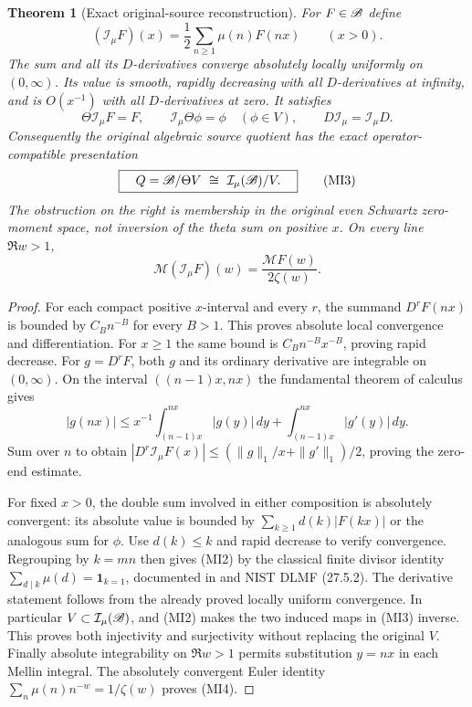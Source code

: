 \documentclass[11pt]{article}
\newtheorem{theorem}{Theorem}[section]
\begin{document}
\begin{theorem}[Exact original-source reconstruction]
For $F\in\mathscr B$ define
\[
 (\mathcal I_\mu F)(x)=\frac12\sum_{n\geq1}\mu(n)F(nx)
       \qquad(x>0).\tag{MI1}
\]
The sum and all its $D$-derivatives converge absolutely locally
uniformly on $(0,\infty)$. Its value is smooth, rapidly decreasing
with all $D$-derivatives at infinity, and is $O(x^{-1})$ with all
$D$-derivatives at zero. It satisfies
\[
 \Theta\mathcal I_\mu F=F,\qquad
 \mathcal I_\mu\Theta\phi=\phi\quad(\phi\in V),\qquad
 D\mathcal I_\mu=\mathcal I_\mu D.
 \tag{MI2}
\]
Consequently the original algebraic source quotient has the exact
operator-compatible presentation
\[
 \boxed{\quad Q=\mathscr B/\Theta V\ \cong\ \mathcal I_\mu(\mathscr B)/V.\quad}
 \tag{MI3}
\]
The obstruction on the right is membership in the original even
Schwartz zero-moment space, not inversion of the theta sum on positive
$x$. On every line $\Re w>1$,
\[
 \mathcal M(\mathcal I_\mu F)(w)
       =\frac{\mathcal MF(w)}{2\zeta(w)}.
 \tag{MI4}
\]
\end{theorem}
\begin{proof}
For each compact positive $x$-interval and every $r$, the summand
$D^rF(nx)$ is bounded by $C_B n^{-B}$ for every $B>1$. This proves
absolute local convergence and differentiation. For $x\geq1$ the
same bound is $C_B n^{-B}x^{-B}$, proving rapid decrease.
For $g=D^rF$, both $g$ and its ordinary derivative are integrable
on $(0,\infty)$. On the interval $((n-1)x,nx)$ the fundamental
theorem of calculus gives
\[
 |g(nx)|\leq x^{-1}\int_{(n-1)x}^{nx}|g(y)|\,dy
                 +\int_{(n-1)x}^{nx}|g'(y)|\,dy.
\]
Sum over $n$ to obtain
$|D^r\mathcal I_\mu F(x)|\leq
 (\|g\|_1/x+\|g'\|_1)/2$, proving the zero-end estimate.

For fixed $x>0$, the double sum involved in either composition is
absolutely convergent: its absolute value is bounded by
$\sum_{k\geq1}d(k)|F(kx)|$ or the analogous sum for $\phi$.
Use $d(k)\leq k$ and rapid decrease to verify convergence.
Regrouping by $k=mn$ then gives (MI2) by the classical finite divisor
identity $\sum_{d\mid k}\mu(d)=\mathbf1_{k=1}$, documented in
\cite[Chapter 2]{cr:ApostolMobius} and NIST DLMF (27.5.2).
The derivative statement follows from the already proved locally
uniform convergence. In particular $V\subset\mathcal I_\mu(\mathscr B)$,
and (MI2) makes the two induced maps in (MI3) inverse. This proves
both injectivity and surjectivity without replacing the original $V$.
Finally absolute integrability on $\Re w>1$ permits substitution
$y=nx$ in each Mellin integral. The absolutely convergent Euler
identity $\sum_n\mu(n)n^{-w}=1/\zeta(w)$ proves (MI4).
\end{proof}
\end{document}

